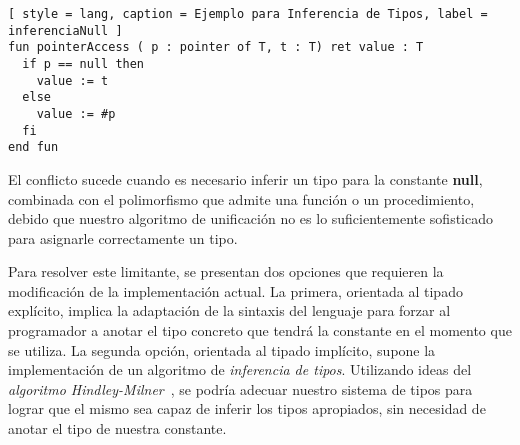 \iffalse
Esto es debido que la constante \textbf{null} tiene tipo polimórfico, lo que significa que puede ser utilizada como un puntero a un entero, como también un puntero a un arreglo, o alguna otra estructura diferente.
Esta característica permite un sistema de tipos más flexible, lo que facilita el uso del intérprete; pero al mismo tiempo, imposibilita el chequeo de tipos cuando el \textit{algoritmo de unificación} necesita de información adicional para inferir un tipo particular en la llamada de una función o procedimiento.
\fi

\begin{lstlisting}[ style = lang, caption = Ejemplo para Inferencia de Tipos, label = inferenciaNull ]
fun pointerAccess ( p : pointer of T, t : T) ret value : T
  if p == null then
    value := t
  else
    value := #p
  fi
end fun
\end{lstlisting}

El conflicto sucede cuando es necesario inferir un tipo para la constante \textbf{null}, combinada con el polimorfismo que admite una función o un procedimiento, debido que nuestro algoritmo de unificación no es lo suficientemente sofisticado para asignarle correctamente un tipo.

Para resolver este limitante, se presentan dos opciones que requieren la modificación de la implementación actual.
La primera, orientada al tipado explícito, implica la adaptación de la sintaxis del lenguaje para forzar al programador a anotar el tipo concreto que tendrá la constante en el momento que se utiliza.
La segunda opción, orientada al tipado implícito, supone la implementación de un algoritmo de \textit{inferencia de tipos}.
Utilizando ideas del \textit{algoritmo Hindley-Milner}~\cite{Inferencia}, se podría adecuar nuestro sistema de tipos para lograr que el mismo sea capaz de inferir los tipos apropiados, sin necesidad de anotar el tipo de nuestra constante.


